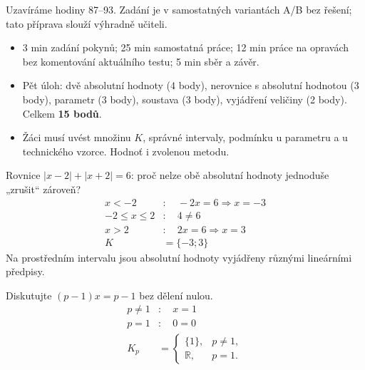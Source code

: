 \documentclass[11pt,a4paper]{article}
\begin{document}
Uzavíráme hodiny 87--93. Zadání je v samostatných variantách A/B bez řešení; tato příprava slouží výhradně učiteli.
\begin{itemize}
\item 3 min zadání pokynů; 25 min samostatná práce; 12 min práce na opravách bez komentování aktuálního testu; 5 min sběr a závěr.
\item Pět úloh: dvě absolutní hodnoty (4 body), nerovnice s absolutní hodnotou (3 body), parametr (3 body), soustava (3 body), vyjádření veličiny (2 body). Celkem \textbf{15 bodů}.
\item Žáci musí uvést množinu $K$, správné intervaly, podmínku u parametru a u technického vzorce. Hodnoť i zvolenou metodu.
\end{itemize}
\begin{prikladReseniBox}[title={Příklad 1}]
Rovnice $|x-2|+|x+2|=6$: proč nelze obě absolutní hodnoty jednoduše „zrušit“ zároveň?
\tcblower
\[\begin{aligned}
x<-2&:\quad -2x=6\Rightarrow x=-3 \\
-2\le x\le2&:\quad 4\ne6 \\
x>2&:\quad 2x=6\Rightarrow x=3 \\
K&=\{-3;3\}
\end{aligned}\]
Na prostředním intervalu jsou absolutní hodnoty vyjádřeny různými lineárními předpisy.
\end{prikladReseniBox}
\begin{zadaniReseniBox}[title={Samostatná práce 1}]
Diskutujte $(p-1)x=p-1$ bez dělení nulou.
\tcblower
\[\begin{aligned}
p\ne1&:\quad x=1 \\
p=1&:\quad0=0 \\
K_p&=\begin{cases}\{1\},&p\ne1,\\\mathbb R,&p=1.\end{cases}
\end{aligned}\]

\end{zadaniReseniBox}
\end{document}
